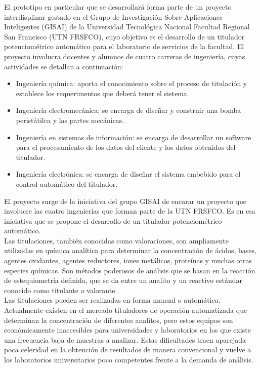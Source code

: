 \documentclass[11pt]{charter}
\begin{document}
El prototipo en particular que se desarrollará forma parte de un proyecto interdisplinar gestado en el Grupo de Investigación Sobre Aplicaciones Inteligentes (GISAI) de la Universidad Tecnológica Nacional Facultad Regional San Francisco (UTN FRSFCO), cuyo objetivo es el desarrollo de un titulador potenciométrico automático para el laboratorio de servicios de la facultad. El proyecto involucra docentes y alumnos de cuatro carreras de ingeniería, cuyas actividades se detallan a continuación:
\begin{itemize}
	\item Ingeniería química: aporta el conocimiento sobre el proceso de titulación y establece los requerimentos que deberá tener el sistema. 
	\item Ingeniería electromecánica: se encarga de diseñar y construir una bomba peristátilca y las partes mecánicas. 
	\item Ingeniería en sistemas de información: se encarga de desarrollar un software para el procesamiento de los datos del cliente y los datos obtenidos del titulador. 
	\item Ingeniería electrónica: se encarga de diseñar el sistema embebido para el control automático del titulador. 
\end{itemize}
El proyecto surge de la iniciativa del grupo GISAI de encarar un proyecto que involucre las cuatro ingenierías que forman parte de la UTN FRSFCO. Es en esa iniciativa que se propone el desarrollo de un titulador potenciométrico automático.\\
Las titulaciones, también conocidas como valoraciones, son ampliamente utilizadas en química analítica para determinar la concentración de ácidos, bases, agentes oxidantes, agentes reductores, iones metálicos, proteínas y muchas otras especies químicas. Son métodos poderosos de análisis que se basan en la reacción de estequiometría definida, que se da entre un analito y un reactivo estándar conocido como titulante o valorante.\\
Las titulaciones pueden ser realizadas en forma manual o automática. Actualmente existen en el mercado tituladores de operación automatizada que determinan la concentración de diferentes analitos, pero estos equipos son económicamente inaccesibles para universidades y laboratorios en los que existe una frecuencia baja de muestras a analizar. Estas dificultades traen aparejada poca celeridad en la obtención de resultados de manera convencional y vuelve a los laboratorios universitarios poco competentes frente a la demanda de análisis.\\
\end{document}
